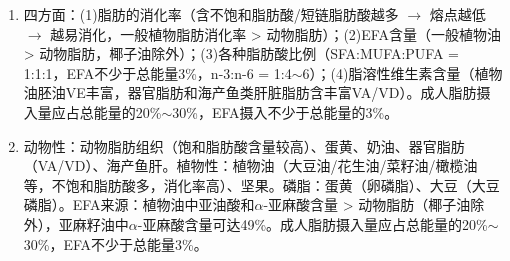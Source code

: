 {\begin{enumerate}[leftmargin=*, itemsep=5pt]
    \item 四方面：(1)脂肪的消化率（含不饱和脂肪酸/短链脂肪酸越多 $\rightarrow$ 熔点越低 $\rightarrow$ 越易消化，一般植物脂肪消化率 > 动物脂肪）；(2)EFA含量（一般植物油 > 动物脂肪，椰子油除外）；(3)各种脂肪酸比例（SFA:MUFA:PUFA = 1:1:1，EFA不少于总能量3\%，n-3:n-6 = 1:4$\sim$6）；(4)脂溶性维生素含量（植物油胚油VE丰富，器官脂肪和海产鱼类肝脏脂肪含丰富VA/VD）。成人脂肪摄入量应占总能量的20\%$\sim$30\%，EFA摄入不少于总能量的3\%。

    \item 动物性：动物脂肪组织（饱和脂肪酸含量较高）、蛋黄、奶油、器官脂肪（VA/VD）、海产鱼肝。植物性：植物油（大豆油/花生油/菜籽油/橄榄油等，不饱和脂肪酸多，消化率高）、坚果。磷脂：蛋黄（卵磷脂）、大豆（大豆磷脂）。EFA来源：植物油中亚油酸和$\alpha$-亚麻酸含量 > 动物脂肪（椰子油除外），亚麻籽油中$\alpha$-亚麻酸含量可达49\%。成人脂肪摄入量应占总能量的20\%$\sim$30\%，EFA不少于总能量3\%。
\end{enumerate}
}
\newpage
